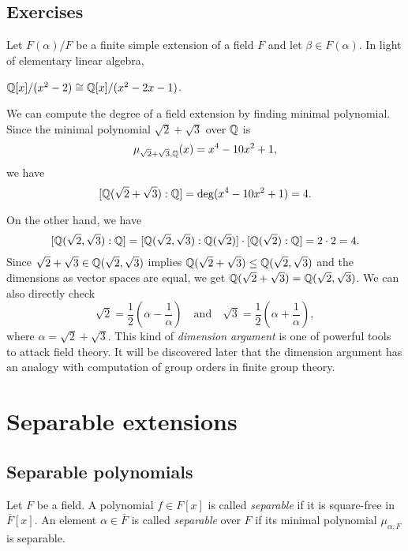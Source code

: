 \documentclass{../../large}
\begin{document}
\section*{Exercises}
\begin{prb}
Let $F(\alpha)/F$ be a finite simple extension of a field $F$ and let $\beta\in F(\alpha)$.
In light of elementary linear algebra,
\end{prb}

\begin{prb}
$\mathbb{Q}[x]/(x^2-2)\cong\mathbb{Q}[x]/(x^2-2x-1)$.
\end{prb}

\begin{prb}
We can compute the degree of a field extension by finding minimal polynomial.
Since the minimal polynomial $\sqrt2+\sqrt3$ over $\mathbb{Q}$ is
\[\mu_{\sqrt2+\sqrt3,\mathbb{Q}}(x)=x^4-10x^2+1,\]
we have
\[[\mathbb{Q}(\sqrt2+\sqrt3):\mathbb{Q}]=\deg(x^4-10x^2+1)=4.\]

On the other hand, we have
\[[\mathbb{Q}(\sqrt2,\sqrt3):\mathbb{Q}]=[\mathbb{Q}(\sqrt2,\sqrt3):\mathbb{Q}(\sqrt2)]\cdot[\mathbb{Q}(\sqrt2):\mathbb{Q}]=2\cdot2=4.\]
Since $\sqrt2+\sqrt3\in\mathbb{Q}(\sqrt2,\sqrt3)$ implies $\mathbb{Q}(\sqrt2+\sqrt3)\le\mathbb{Q}(\sqrt2,\sqrt3)$ and the dimensions as vector spaces are equal, we get $\mathbb{Q}(\sqrt2+\sqrt3)=\mathbb{Q}(\sqrt2,\sqrt3)$.
We can also directly check
\[\sqrt2=\frac12\left(\alpha-\frac1\alpha\right)\quad\text{and}\quad\sqrt3=\frac12\left(\alpha+\frac1\alpha\right),\]
where $\alpha=\sqrt2+\sqrt3$.
This kind of \emph{dimension argument} is one of powerful tools to attack field theory.
It will be discovered later that the dimension argument has an analogy with computation of group orders in finite group theory.
\end{prb}











\chapter{Separable extensions}

\section{Separable polynomials}
\begin{defn}
Let $F$ be a field.
A polynomial $f\in F[x]$ is called \emph{separable} if it is square-free in $\bar F[x]$.
An element $\alpha\in\bar F$ is called \emph{separable} over $F$ if its minimal polynomial $\mu_{\alpha,F}$ is separable.
\end{defn}
\end{document}
